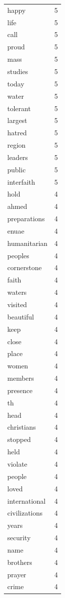 \begin{tabular}{lr}
happy & 5 \\
life & 5 \\
call & 5 \\
proud & 5 \\
mass & 5 \\
studies & 5 \\
today & 5 \\
water & 5 \\
tolerant & 5 \\
largest & 5 \\
hatred & 5 \\
region & 5 \\
leaders & 5 \\
public & 5 \\
interfaith & 5 \\
hold & 4 \\
ahmed & 4 \\
preparations & 4 \\
enuae & 4 \\
humanitarian & 4 \\
peoples & 4 \\
cornerstone & 4 \\
faith & 4 \\
waters & 4 \\
visited & 4 \\
beautiful & 4 \\
keep & 4 \\
close & 4 \\
place & 4 \\
women & 4 \\
members & 4 \\
presence & 4 \\
th & 4 \\
head & 4 \\
christians & 4 \\
stopped & 4 \\
held & 4 \\
violate & 4 \\
people & 4 \\
loved & 4 \\
international & 4 \\
civilizations & 4 \\
years & 4 \\
security & 4 \\
name & 4 \\
brothers & 4 \\
prayer & 4 \\
crime & 4 \\

\end{tabular}
